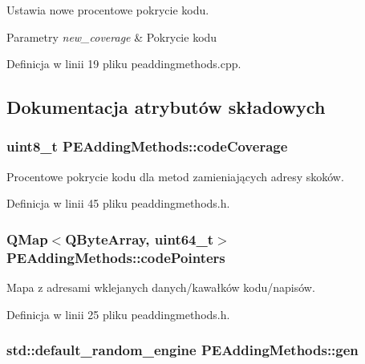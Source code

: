 Ustawia nowe procentowe pokrycie kodu. 


\begin{DoxyParams}{Parametry}
{\em new\-\_\-coverage} & Pokrycie kodu \\
\hline
\end{DoxyParams}


Definicja w linii 19 pliku peaddingmethods.\-cpp.



\subsection{Dokumentacja atrybutów składowych}
\hypertarget{class_p_e_adding_methods_af24025d4fc427613750acbca819978cd}{
\subsubsection[{code\-Coverage}]{\setlength{\rightskip}{0pt plus 5cm}uint8\-\_\-t P\-E\-Adding\-Methods\-::code\-Coverage\hspace{0.3cm}{\ttfamily [private]}}}\label{class_p_e_adding_methods_af24025d4fc427613750acbca819978cd}


Procentowe pokrycie kodu dla metod zamieniających adresy skoków. 



Definicja w linii 45 pliku peaddingmethods.\-h.

\hypertarget{class_p_e_adding_methods_a82688d8dd0d6fac444e7b54ed6519600}{
\subsubsection[{code\-Pointers}]{\setlength{\rightskip}{0pt plus 5cm}Q\-Map$<$Q\-Byte\-Array, uint64\-\_\-t$>$ P\-E\-Adding\-Methods\-::code\-Pointers\hspace{0.3cm}{\ttfamily [private]}}}\label{class_p_e_adding_methods_a82688d8dd0d6fac444e7b54ed6519600}


Mapa z adresami wklejanych danych/kawałków kodu/napisów. 



Definicja w linii 25 pliku peaddingmethods.\-h.

\hypertarget{class_p_e_adding_methods_a43fe76ed7c6fc1345b85718c5d9a436a}{
\subsubsection[{gen}]{\setlength{\rightskip}{0pt plus 5cm}std\-::default\-\_\-random\-\_\-engine P\-E\-Adding\-Methods\-::gen\hspace{0.3cm}{\ttfamily [private]}}}\label{class_p_e_adding_methods_a43fe76ed7c6fc1345b85718c5d9a436a}


